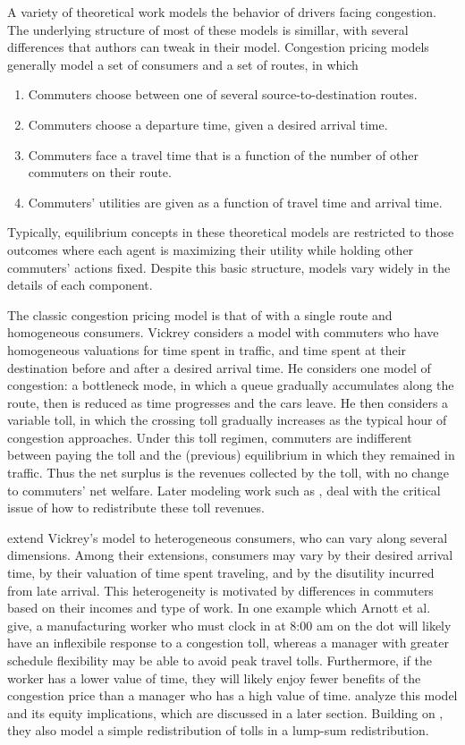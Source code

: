 \documentclass[JEL]{AEA}
\begin{document}
A variety of theoretical work models the behavior of drivers facing congestion. The underlying structure of most of these models is simillar, with several differences that authors can tweak in their model. Congestion pricing models generally model a set of consumers and a set of routes, in which 

\begin{enumerate}
    \item Commuters choose between one of several source-to-destination routes.
    \item Commuters choose a departure time, given a desired arrival time.
    \item Commuters face a travel time that is a function of the number of other commuters on their route.
    \item Commuters' utilities are given as a function of travel time and arrival time.
\end{enumerate}

Typically, equilibrium concepts in these theoretical models are restricted to those outcomes where each agent is maximizing their utility while holding other commuters' actions fixed. Despite this basic structure, models vary widely in the details of each component. 

The classic congestion pricing model is that of \cite{vickrey-1969} with a single route and homogeneous consumers. Vickrey considers a model with commuters who have homogeneous valuations for time spent in traffic, and time spent at their destination before and after a desired arrival time. He considers one model of congestion: a bottleneck mode, in which a queue gradually accumulates along the route, then is reduced as time progresses and the cars leave. He then considers a variable toll, in which the crossing toll gradually increases as the typical hour of congestion approaches. Under this toll regimen, commuters are indifferent between paying the toll and the (previous) equilibrium in which they remained in traffic. Thus the net surplus is the revenues collected by the toll, with no change to commuters' net welfare. Later modeling work such as \cite{eliasson-2006}, deal with the critical issue of how to redistribute these toll revenues.

\cite{arnott-1994} extend Vickrey's model to heterogeneous consumers, who can vary along several dimensions. Among their extensions, consumers may vary by their desired arrival time, by their valuation of time spent traveling, and by the disutility incurred from late arrival. This heterogeneity is motivated by differences in commuters based on their incomes and type of work. In one example which Arnott et al. give, a manufacturing worker who must clock in at 8:00 am on the dot will likely have an inflexibile response to a congestion toll, whereas a manager with greater schedule flexibility may be able to avoid peak travel tolls. Furthermore, if the worker has a lower value of time, they will likely enjoy fewer benefits of the congestion price than a manager who has a high value of time. \cite{arnott-1994} analyze this model and its equity implications, which are discussed in a later section. Building on \cite{vickrey-1969}, they also model a simple redistribution of tolls in a lump-sum redistribution. 
\end{document}
